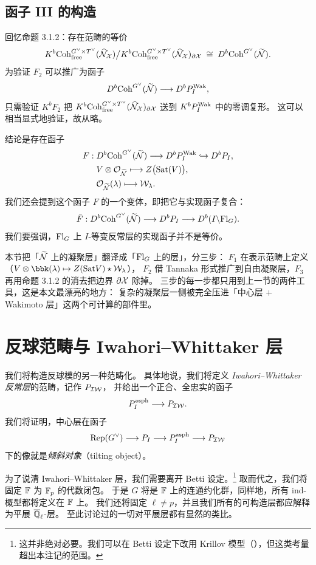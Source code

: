 \subsection{函子 III 的构造}\label{sec:F3}

回忆命题 3.1.2：存在范畴的等价
\[
K^b\mathrm{Coh}^{G^\vee\times T^\vee}_{\mathrm{free}}(\widehat{\mathcal{N}}_{\mathcal{X}})\big/
K^b\mathrm{Coh}^{G^\vee\times T^\vee}_{\mathrm{free}}(\widehat{\mathcal{N}}_{\mathcal{X}})_{\partial\mathcal{X}}
\;\cong\; D^b\mathrm{Coh}^{G^\vee}(\widetilde{\mathcal{N}}).
\]
为验证 $F_2$ 可以推广为函子
\[
D^b\mathrm{Coh}^{G^\vee}(\widetilde{\mathcal{N}})\longrightarrow D^bP_I^{\mathrm{Wak}},
\]
只需验证 $K^bF_2$ 把 $K^b\mathrm{Coh}^{G^\vee\times T^\vee}_{\mathrm{free}}(\widehat{\mathcal{N}}_{\mathcal{X}})_{\partial\mathcal{X}}$
送到 $K^bP_I^{\mathrm{Wak}}$ 中的零调复形。
这可以相当显式地验证，故从略。

结论是存在函子
\begin{align*}
F:\;&D^b\mathrm{Coh}^{G^\vee}(\widetilde{\mathcal{N}})\longrightarrow D^bP_I^{\mathrm{Wak}}\hookrightarrow D^bP_I,\\
&V\otimes\mathcal{O}_{\widetilde{\mathcal{N}}}\longmapsto Z\bigl(\mathrm{Sat}(V)\bigr),\\
&\mathcal{O}_{\widetilde{\mathcal{N}}}(\lambda)\longmapsto\mathcal{W}_\lambda .
\end{align*}
我们还会提到这个函子 $F$ 的一个变体，即把它与实现函子复合：
\[
\bar F:D^b\mathrm{Coh}^{G^\vee}(\widetilde{\mathcal{N}})\longrightarrow D^bP_I\longrightarrow D^b(I\backslash\mathrm{Fl}_G).
\]
我们要强调，$\mathrm{Fl}_G$ 上 $I$-等变反常层的实现函子并不是等价。

\begin{keytakeaways}
本节把「$\widetilde{\mathcal{N}}$ 上的凝聚层」翻译成「$\mathrm{Fl}_G$ 上的层」，分三步：
$F_1$ 在表示范畴上定义（$V\otimes\bbk(\lambda)\mapsto Z(\Sat V)\conv\mathcal{W}_\lambda$），
$F_2$ 借 Tannaka 形式推广到自由凝聚层，$F_3$ 再用命题 3.1.2 的消去把边界 $\partial\mathcal{X}$ 除掉。
三步的每一步都只用到上一节的两件工具，这是本文最漂亮的地方：
复杂的凝聚层一侧被完全压进「中心层 $+$ Wakimoto 层」这两个可计算的部件里。
\end{keytakeaways}

\section{反球范畴与 Iwahori–Whittaker 层}

我们将构造反球模的另一种范畴化。
具体地说，我们将定义 \emph{Iwahori–Whittaker 反常层}的范畴，记作 $P_{\mathcal{IW}}$，
并给出一个正合、全忠实的函子
\[
P_I^{\mathrm{asph}}\longrightarrow P_{\mathcal{IW}} .
\]
我们将证明，中心层在函子
\[
\mathrm{Rep}(G^\vee)\longrightarrow P_I\longrightarrow P_I^{\mathrm{asph}}\longrightarrow P_{\mathcal{IW}}
\]
下的像就是\emph{倾斜对象}（tilting object）。

\begin{remark}
为了说清 Iwahori–Whittaker 层，我们需要离开 Betti 设定。\footnote{这并非绝对必要。我们可以在 Betti 设定下改用 Krillov 模型（\cite{Gai2}），但这类考量超出本注记的范围。}
取而代之，我们将固定 $\mathbb{F}$ 为 $\mathbb{F}_p$ 的代数闭包。
于是 $G$ 将是 $\mathbb{F}$ 上的连通约化群，同样地，所有 ind-概型都将定义在 $\mathbb{F}$ 上。
我们还将固定 $\ell\neq p$，并且我们所有的可构造层都应解释为平展 $\overline{\mathbb{Q}}_{\ell}$-层。
至此讨论过的一切对平展层都有显然的类比。
\end{remark}

